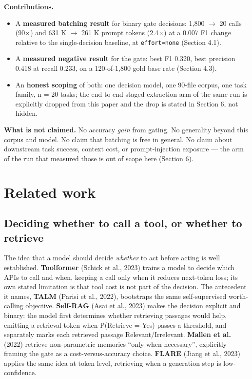 \documentclass[11pt,a4paper]{article}
\begin{document}
\textbf{Contributions.}

\begin{itemize}
\item A \textbf{measured batching result} for binary gate decisions: 1,800 $\to$ 20 calls (90$\times$) and 631 K $\to$ 261 K prompt tokens (2.4$\times$) at a 0.007 F1 change relative to the single-decision baseline, at \texttt{effort=none} (Section 4.1).
\item A \textbf{measured negative result} for the gate: best F1 0.320, best precision 0.418 at recall 0.233, on a 120-of-1,800 gold base rate (Section 4.3).
\item An \textbf{honest scoping} of both: one decision model, one 90-file corpus, one task family, n = 20 tasks; the end-to-end staged-extraction arm of the same run is explicitly dropped from this paper and the drop is stated in Section 6, not hidden.
\end{itemize}

\textbf{What is not claimed.} No accuracy \emph{gain} from gating. No generality beyond this corpus and model. No claim that batching is free in general. No claim about downstream task success, context cost, or prompt-injection exposure --- the arm of the run that measured those is out of scope here (Section 6).

\section{Related work}

\subsection{Deciding whether to call a tool, or whether to retrieve}

The idea that a model should decide \emph{whether} to act before acting is well established. \textbf{Toolformer} (Schick et al., 2023)\cite{ref11} trains a model to decide which APIs to call and when, keeping a call only when it reduces next-token loss; its own stated limitation is that tool cost is not part of the decision. The antecedent it names, \textbf{TALM} (Parisi et al., 2022)\cite{ref9}, bootstraps the same self-supervised worth-calling objective. \textbf{Self-RAG} (Asai et al., 2023)\cite{ref1} makes the decision explicit and binary: the model first determines whether retrieving passages would help, emitting a retrieval token when P(Retrieve = Yes) passes a threshold, and separately marks each retrieved passage Relevant/Irrelevant. \textbf{Mallen et al.} (2022)\cite{ref7} retrieve non-parametric memories ``only when necessary'', explicitly framing the gate as a cost-versus-accuracy choice. \textbf{FLARE} (Jiang et al., 2023)\cite{ref5} applies the same idea at token level, retrieving when a generation step is low-confidence.
\end{document}
